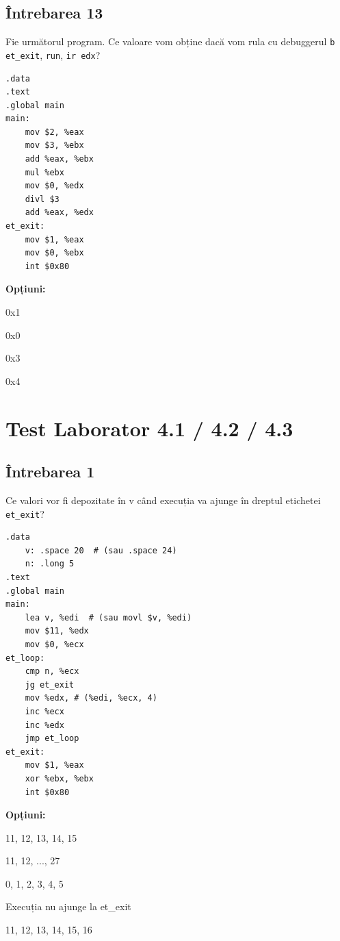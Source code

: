 \documentclass[12pt,a4paper]{article}
\begin{document}
\subsection*{Întrebarea 13}
Fie următorul program. Ce valoare vom obține dacă vom rula cu debuggerul \texttt{b et\_exit}, \texttt{run}, \texttt{ir edx}?
\begin{lstlisting}[language=x86asm, caption={Cod Sursa (Lab 3.2)}]
.data
.text
.global main
main:
    mov $2, %eax
    mov $3, %ebx
    add %eax, %ebx
    mul %ebx
    mov $0, %edx
    divl $3
    add %eax, %edx
et_exit:
    mov $1, %eax
    mov $0, %ebx
    int $0x80
\end{lstlisting}

\textbf{Opțiuni:}
\begin{itemize*}
    \item 0x1
    \item 0x0
    \item 0x3
    \item 0x4 
\end{itemize*}

\newpage
\section{Test Laborator 4.1 / 4.2 / 4.3}

\subsection*{Întrebarea 1}
Ce valori vor fi depozitate în v când execuția va ajunge în dreptul etichetei \texttt{et\_exit}?
\begin{lstlisting}[language=x86asm, caption={Cod Sursa (Lab 4.1/4.2/4.3)}]
.data
    v: .space 20  # (sau .space 24)
    n: .long 5
.text
.global main
main:
    lea v, %edi  # (sau movl $v, %edi)
    mov $11, %edx
    mov $0, %ecx
et_loop:
    cmp n, %ecx
    jg et_exit
    mov %edx, # (%edi, %ecx, 4)
    inc %ecx
    inc %edx
    jmp et_loop
et_exit:
    mov $1, %eax
    xor %ebx, %ebx
    int $0x80
\end{lstlisting}

\textbf{Opțiuni:}
\begin{itemize*}
    \item 11, 12, 13, 14, 15
    \item 11, 12, ..., 27
    \item 0, 1, 2, 3, 4, 5
    \item Execuția nu ajunge la et\_exit
    \item 11, 12, 13, 14, 15, 16 
\end{itemize*}
\end{document}
